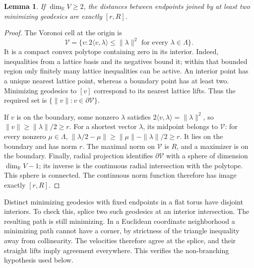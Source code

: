 \documentclass[12pt]{amsart}
\newcommand{\LemmaName}{Lemma}
\newtheorem{lem}[thm]{\LemmaName}
\theoremstyle{definition}
\theoremstyle{remark}
\numberwithin{equation}{section}
\newcommand{\R}{\mathbb{R}}
\begin{document}
\begin{lem}\label{en:cut}
If $\dim_\R V\geq2$, the distances between endpoints joined by at least two minimizing geodesics are exactly $[r,R]$.
\end{lem}
\begin{proof}
The Voronoi cell at the origin is
\[
\mathcal V=\{v:2\langle v,\lambda\rangle\leq\|\lambda\|^2
\text{ for every }\lambda\in\Lambda\}.
\]
It is a compact convex polytope containing zero in its interior. Indeed, inequalities from a lattice basis and its negatives bound it; within that bounded region only finitely many lattice inequalities can be active. An interior point has a unique nearest lattice point, whereas a boundary point has at least two. Minimizing geodesics to $[v]$ correspond to its nearest lattice lifts. Thus the required set is $\{\|v\|:v\in\partial\mathcal V\}$.

If $v$ is on the boundary, some nonzero $\lambda$ satisfies
$2\langle v,\lambda\rangle=\|\lambda\|^2$, so
$\|v\|\geq\|\lambda\|/2\geq r$.
For a shortest vector $\lambda$, its midpoint belongs to $\mathcal V$: for every nonzero $\mu\in\Lambda$,
$\|\lambda/2-\mu\|\geq\|\mu\|-\|\lambda\|/2\geq r$.
It lies on the boundary and has norm $r$. The maximal norm on $\mathcal V$ is $R$, and a maximizer is on the boundary. Finally, radial projection identifies $\partial\mathcal V$ with a sphere of dimension $\dim_\R V-1$; its inverse is the continuous radial intersection with the polytope. This sphere is connected. The continuous norm function therefore has image exactly $[r,R]$.
\end{proof}

Distinct minimizing geodesics with fixed endpoints in a flat torus have disjoint interiors. To check this, splice two such geodesics at an interior intersection. The resulting path is still minimizing. In a Euclidean coordinate neighborhood a minimizing path cannot have a corner, by strictness of the triangle inequality away from collinearity. The velocities therefore agree at the splice, and their straight lifts imply agreement everywhere. This verifies the non-branching hypothesis used below.
\end{document}
